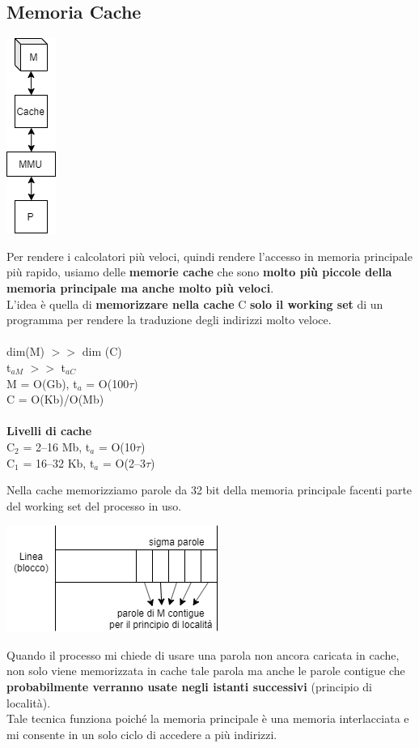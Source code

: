 \documentclass[10pt]{report}
\begin{document}
\subsection{Memoria Cache}
\begin{multicols}{2}
\begin{center}
\includegraphics[scale=1]{memhierarchy.png}
\end{center}
Per rendere i calcolatori più veloci, quindi rendere l'accesso in memoria principale più rapido, usiamo delle \textbf{memorie cache} che sono \textbf{molto più piccole della memoria principale ma anche molto più veloci}.\\
L'idea è quella di \textbf{memorizzare nella cache} C \textbf{solo il working set} di un programma per rendere la traduzione degli indirizzi molto veloce.\\\\
dim(M) $>>$ dim (C)\\
t$_{aM}$ $>>$ t$_{aC}$\\
M = O(Gb), t$_a$ = O(100$\tau$)\\
C = O(Kb)/O(Mb)\\\\
\textbf{Livelli di cache}\\
C$_2$ = 2--16 Mb, t$_a$ = O(10$\tau$)\\
C$_1$ = 16--32 Kb, t$_a$ = O(2--3$\tau$)
\end{multicols}
\pagebreak
Nella cache memorizziamo parole da 32 bit della memoria principale facenti parte del working set del processo in uso.
\begin{multicols}{2}
\begin{center}
\includegraphics[scale=0.9]{cacheline.png}
\end{center}
Quando il processo mi chiede di usare una parola non ancora caricata in cache, non solo viene memorizzata in cache tale parola ma anche le parole contigue che \textbf{probabilmente verranno usate negli istanti successivi} (principio di località).\\
Tale tecnica funziona poiché la memoria principale è una memoria interlacciata e mi consente in un solo ciclo di accedere a più indirizzi.
\end{multicols}
\end{document}
